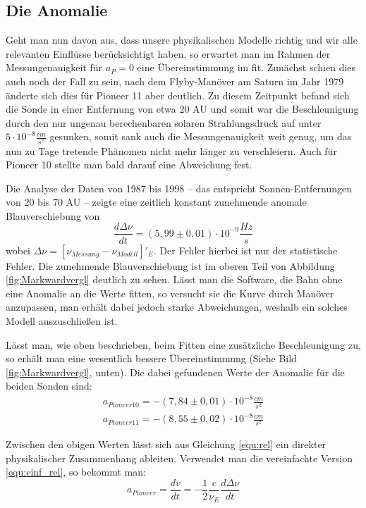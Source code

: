 \subsection{Die Anomalie}
Geht man nun davon aus, dass unsere physikalischen Modelle richtig und wir alle relevanten Einflüsse berücksichtigt haben, so erwartet man im Rahmen der Messungenauigkeit für $a_P = 0$ eine Übereinstimmung im fit.
Zunächst schien dies auch noch der Fall zu sein, nach dem Flyby-Manöver am Saturn im Jahr 1979 änderte sich dies für Pioneer 11 aber deutlich. Zu diesem Zeitpunkt befand sich die Sonde in einer Entfernung von etwa 20 AU und somit war die Beschleunigung durch den nur ungenau berechenbaren solaren Strahlungsdruck auf unter $5 \cdot 10^{-8} \frac{cm}{s^2}$ gesunken, %
somit sank auch die Messungenauigkeit weit genug, um das nun zu Tage tretende Phänomen nicht mehr länger zu verschleiern.
Auch für Pioneer 10 stellte man bald darauf eine Abweichung fest.

Die Analyse der Daten von 1987 bis 1998 – das entspricht Sonnen-Entfernungen von 20 bis 70 AU –
zeigte eine zeitlich konstant zunehmende anomale Blauverschiebung von
\begin{equation}
  \frac{d\Delta\nu}{dt}=(5,99\pm0,01)\cdot10^{-9}\frac{Hz}{s}
\end{equation}
wobei $\Delta\nu=[\nu_{Messung}-\nu_{Modell}]'_E$\cite{Dittus2006}. Der Fehler hierbei ist nur der statistische Fehler. Die zunehmende Blauverschiebung ist im oberen Teil von Abbildung \ref{fig:Markwardvergl} deutlich zu sehen. Lässt man die Software, die Bahn ohne eine Anomalie an die Werte fitten, so versucht sie  die Kurve durch Manöver anzupassen, man erhält dabei jedoch starke Abweichungen, weshalb ein solches Modell auszuschließen ist\cite{Markwardt2002}.

Lässt man, wie oben beschrieben, beim Fitten eine zusätzliche Beschleunigung zu, so erhält man eine wesentlich bessere Übereinstimmung (Siehe Bild \ref{fig:Markwardvergl}, unten). Die dabei gefundenen Werte der Anomalie für die beiden Sonden sind:
\begin{eqnarray}
  a_{Pioneer 10} = -(7,84\pm0,01)\cdot10^{-8}\frac{cm}{s^2} \\  
  a_{Pioneer 11} = -(8,55\pm0,02)\cdot10^{-8}\frac{cm}{s^2}
\end{eqnarray}

Zwischen den obigen Werten lässt sich aus Gleichung \ref{equ:rel} ein direkter physikalischer Zusammenhang ableiten. Verwendet man die vereinfachte Version \ref{equ:einf_rel}, so bekommt man:
\begin{equation}
  a_{Pioneer}=\frac{dv}{dt}=-\frac{1}{2}\frac{c}{\nu_E}\frac{d\Delta\nu}{dt}
\end{equation}

